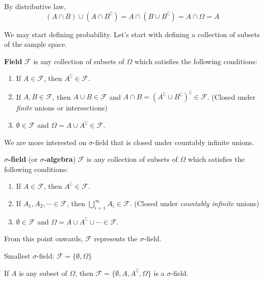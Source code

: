 \documentclass{huhtakm-template-book}
\begin{document}
\begin{proofing}
	By distributive law,
	\begin{equation*}
		(A\cap B)\cup(A\cap B^{\complement})=A\cap(B\cup B^{\complement})=A\cap\Omega=A
	\end{equation*}
\end{proofing}
We may start defining probability. Let's start with defining a collection of subsets of the sample space.
\begin{defn}
	\textbf{Field} $\mathcal{F}$ is any collection of subsets of $\Omega$ which satisfies the following conditions:
	\begin{enumerate}
		\item If $A\in\mathcal{F}$, then $A^{\complement}\in\mathcal{F}$.
		\item If $A,B\in\mathcal{F}$, then $A\cup B\in\mathcal{F}$ and $A\cap B=(A^{\complement}\cup B^{\complement})^{\complement}\in\mathcal{F}$. (Closed under \textit{finite} unions or intersections)
		\item $\emptyset\in\mathcal{F}$ and $\Omega=A\cup A^{\complement}\in\mathcal{F}$.
	\end{enumerate}
\end{defn}
We are more interested on $\sigma$-field that is closed under countably infinite unions.
\begin{defn} %
	\textbf{$\sigma$-field} (or \textbf{$\sigma$-algebra}) $\mathcal{F}$ is any collection of subsets of $\Omega$ which satisfies the following conditions:
	\begin{enumerate}
		\item If $A\in\mathcal{F}$, then $A^{\complement}\in\mathcal{F}$.
		\item If $A_{1},A_{2},\cdots\in\mathcal{F}$, then $\bigcup_{i=1}^{\infty}A_{i}\in\mathcal{F}$. (Closed under \textit{countably infinite} unions)
		\item $\emptyset\in\mathcal{F}$ and $\Omega=A\cup A^{\complement}\cup\cdots\in\mathcal{F}$.
	\end{enumerate}
\end{defn}
\begin{rem}
	From this point onwards, $\mathcal{F}$ represents the $\sigma$-field.
\end{rem}
\begin{eg}
	Smallest $\sigma$-field: $\mathcal{F}=\{\emptyset,\Omega\}$
\end{eg}
\begin{eg}
	If $A$ is any subset of $\Omega$, then $\mathcal{F}=\{\emptyset,A,A^{\complement},\Omega\}$ is a $\sigma$-field.
\end{eg}
\end{document}
